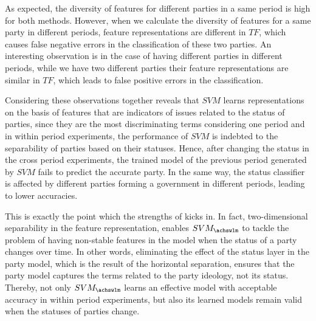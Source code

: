 As expected, the diversity of features for different parties in a same period is high for both methods. However, when we calculate the diversity of features for a same party in different periods, feature representations are different in  $TF$, which causes false negative errors in the classification of these two parties. An interesting observation is in the case of having different parties in different periods, while we have two different parties their feature representations are similar in $TF$, which leads to false positive errors in the classification. 

Considering these observations together reveals that $SVM$ learns representations on the basis of features that are indicators of issues related to the status of parties, since they are the most discriminating terms considering one period and in within period experiments, the performance of $SVM$ is indebted to the separability of parties based on their statuses. Hence, after changing the status in the cross period experiments, the trained model of the previous period generated by $SVM$ fails to predict the accurate party.  In the same way, the status classifier is affected by different parties forming a government in different periods, leading to lower accuracies.   

This is exactly the point which the strengths of \achswlm kicks in. In fact, two\:-\:dimensional separability in the feature representation, enables $SVM_{\achswlm}$ to tackle the problem of having non-stable features in the model when the status of a party changes over time. In other words, eliminating the effect of the status layer in the party model, which is the result of the horizontal separation, ensures that the party model captures the terms related to the party ideology, not its status. Thereby, not only $SVM_{\achswlm}$ learns an effective model with acceptable accuracy in within period experiments, but also its learned models remain valid when the statuses of parties change. 
